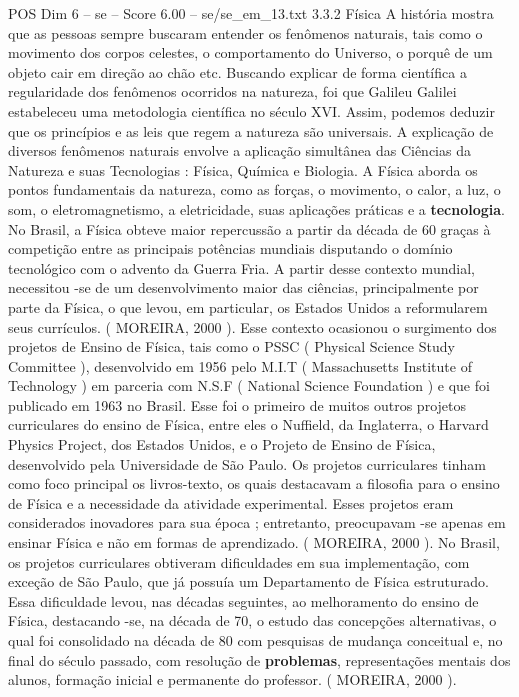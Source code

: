 \begin{textsample}{POS Dim 6 – se – Score 6.00 – se/se\_em\_13.txt}  \label{ex:f6_pos_050}
3.3.2 Física A história mostra que as pessoas sempre buscaram entender os fenômenos naturais, tais como o movimento dos corpos celestes, o comportamento do Universo, o porquê de um objeto cair em direção ao chão etc.
Buscando explicar de forma científica a regularidade dos fenômenos ocorridos na natureza, foi que Galileu Galilei estabeleceu uma metodologia científica no século XVI.
Assim, podemos deduzir que os princípios e as leis que regem a natureza são universais.
A explicação de diversos fenômenos naturais envolve a aplicação simultânea das Ciências da Natureza e suas Tecnologias : Física, Química e Biologia.
A Física aborda os pontos fundamentais da natureza, como as forças, o movimento, o calor, a luz, o som, o eletromagnetismo, a eletricidade, suas aplicações práticas e a \textbf{tecnologia}.
No Brasil, a Física obteve maior repercussão a partir da década de 60 graças à competição entre as principais potências mundiais disputando o domínio tecnológico com o advento da Guerra Fria.
A partir desse contexto mundial, necessitou -se de um desenvolvimento maior das ciências, principalmente por parte da Física, o que levou, em particular, os Estados Unidos a reformularem seus currículos. ( MOREIRA, 2000 ).
Esse contexto ocasionou o surgimento dos projetos de Ensino de Física, tais como o PSSC ( Physical Science Study Committee ), desenvolvido em 1956 pelo M.I.T ( Massachusetts Institute of Technology ) em parceria com N.S.F ( National Science Foundation ) e que foi publicado em 1963 no Brasil.
Esse foi o primeiro de muitos outros projetos curriculares do ensino de Física, entre eles o Nuffield, da Inglaterra, o Harvard Physics Project, dos Estados Unidos, e o Projeto de Ensino de Física, desenvolvido pela Universidade de São Paulo.
Os projetos curriculares tinham como foco principal os livros-texto, os quais destacavam a filosofia para o ensino de Física e a necessidade da atividade experimental.
Esses projetos eram considerados inovadores para sua época ; entretanto, preocupavam -se apenas em ensinar Física e não em formas de aprendizado. ( MOREIRA, 2000 ).
No Brasil, os projetos curriculares obtiveram dificuldades em sua implementação, com exceção de São Paulo, que já possuía um Departamento de Física estruturado.
Essa dificuldade levou, nas décadas seguintes, ao melhoramento do ensino de Física, destacando -se, na década de 70, o estudo das concepções alternativas, o qual foi consolidado na década de 80 com pesquisas de mudança conceitual e, no final do século passado, com resolução de \textbf{problemas}, representações mentais dos alunos, formação inicial e permanente do professor. ( MOREIRA, 2000 ).

\end{textsample}
